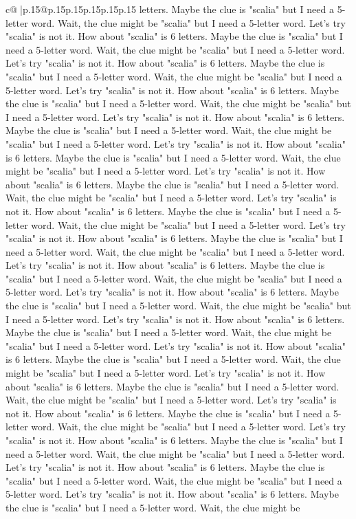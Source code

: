 \documentclass{article}
\begin{document}
{\begin{supertabular}{c@{$\;$}|p{.15\linewidth}@{}p{.15\linewidth}p{.15\linewidth}p{.15\linewidth}p{.15\linewidth}p{.15\linewidth}}
{{{letters. Maybe the clue is "scalia" but I need a 5{-}letter word. Wait, the clue might be "scalia" but I need a 5{-}letter word. Let's try "scalia" is not it. How about "scalia" is 6 letters. Maybe the clue is "scalia" but I need a 5{-}letter word. Wait, the clue might be "scalia" but I need a 5{-}letter word. Let's try "scalia" is not it. How about "scalia" is 6 letters. Maybe the clue is "scalia" but I need a 5{-}letter word. Wait, the clue might be "scalia" but I need a 5{-}letter word. Let's try "scalia" is not it. How about "scalia" is 6 letters. Maybe the clue is "scalia" but I need a 5{-}letter word. Wait, the clue might be "scalia" but I need a 5{-}letter word. Let's try "scalia" is not it. How about "scalia" is 6 letters. Maybe the clue is "scalia" but I need a 5{-}letter word. Wait, the clue might be "scalia" but I need a 5{-}letter word. Let's try "scalia" is not it. How about "scalia" is 6 letters. Maybe the clue is "scalia" but I need a 5{-}letter word. Wait, the clue might be "scalia" but I need a 5{-}letter word. Let's try "scalia" is not it. How about "scalia" is 6 letters. Maybe the clue is "scalia" but I need a 5{-}letter word. Wait, the clue might be "scalia" but I need a 5{-}letter word. Let's try "scalia" is not it. How about "scalia" is 6 letters. Maybe the clue is "scalia" but I need a 5{-}letter word. Wait, the clue might be "scalia" but I need a 5{-}letter word. Let's try "scalia" is not it. How about "scalia" is 6 letters. Maybe the clue is "scalia" but I need a 5{-}letter word. Wait, the clue might be "scalia" but I need a 5{-}letter word. Let's try "scalia" is not it. How about "scalia" is 6 letters. Maybe the clue is "scalia" but I need a 5{-}letter word. Wait, the clue might be "scalia" but I need a 5{-}letter word. Let's try "scalia" is not it. How about "scalia" is 6 letters. Maybe the clue is "scalia" but I need a 5{-}letter word. Wait, the clue might be "scalia" but I need a 5{-}letter word. Let's try "scalia" is not it. How about "scalia" is 6 letters. Maybe the clue is "scalia" but I need a 5{-}letter word. Wait, the clue might be "scalia" but I need a 5{-}letter word. Let's try "scalia" is not it. How about "scalia" is 6 letters. Maybe the clue is "scalia" but I need a 5{-}letter word. Wait, the clue might be "scalia" but I need a 5{-}letter word. Let's try "scalia" is not it. How about "scalia" is 6 letters. Maybe the clue is "scalia" but I need a 5{-}letter word. Wait, the clue might be "scalia" but I need a 5{-}letter word. Let's try "scalia" is not it. How about "scalia" is 6 letters. Maybe the clue is "scalia" but I need a 5{-}letter word. Wait, the clue might be "scalia" but I need a 5{-}letter word. Let's try "scalia" is not it. How about "scalia" is 6 letters. Maybe the clue is "scalia" but I need a 5{-}letter word. Wait, the clue might be "scalia" but I need a 5{-}letter word. Let's try "scalia" is not it. How about "scalia" is 6 letters. Maybe the clue is "scalia" but I need a 5{-}letter word. Wait, the clue might be "scalia" but I need a 5{-}letter word. Let's try "scalia" is not it. How about "scalia" is 6 letters. Maybe the clue is "scalia" but I need a 5{-}letter word. Wait, the clue might be }}}
\end{supertabular}}
\end{document}
